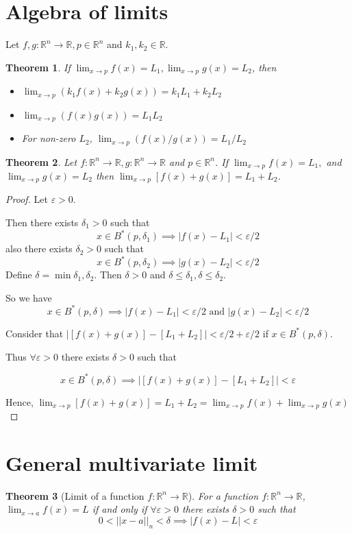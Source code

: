\documentclass[oneside,11pt,pdftex]{book}%
\numberwithin{equation}{section}
\newtheorem{theorem}{Theorem}[chapter]%
\numberwithin{section}{chapter}
\numberwithin{equation}{chapter}
\newcommand{\R}{\mathbb{R}}
\begin{document}
\section{Algebra of limits}
Let $ f,g: \R^n \rightarrow \R, p \in \R^n $ and $ k_1,k_2 \in \R $.
\begin{theorem}
	If $ \lim_{x \rightarrow p} f(x)=L_1, \lim_{x\rightarrow p}g(x)=L_2 $, then
	\begin{itemize}
		\item $\displaystyle \lim_{x \rightarrow p} (k_1 f(x)+k_2 g(x))=k_1 L_1+k_2 L_2 $
		\item $\displaystyle \lim_{x \rightarrow p} (f(x)g(x))=L_1 L_2 $
		\item For non-zero $ L_2 $, $\displaystyle \lim_{x \rightarrow p} (f(x)/g(x))=L_1/L_2 $
	\end{itemize}
\end{theorem}
\begin{theorem}
	Let $ f:\R^n \to \R, g:\R^n \to \R $ and $ p \in \R^n$. If $ \lim_{x\rightarrow p} f(x)=L_1, $ and $ \lim_{x \rightarrow p} g(x) =L_2$ then $ \lim_{x\rightarrow p} [f(x)+g(x)]=L_1+L_2 $.
\end{theorem}
\begin{proof}
	Let $ \varepsilon>0 $. 
	
	Then there exists $ \delta_1>0 $ such that\[ x \in B^*(p, \delta_1) \implies |f(x)-L_1|<\varepsilon/2 \]
	also there exists $ \delta_2>0 $ such that
	\[ x \in B^*(p,\delta_2) \implies |g(x)-L_2|<\varepsilon/2 \]
	Define $ \delta=\min{\delta_1,\delta_2 } $. Then $ \delta>0 $ and $ \delta\leq\delta_1,\delta\leq\delta_2  $.
	
	So we have $$ x\in B^*(p,\delta) \implies |f(x)-L_1|<\varepsilon/2 \text{ and } |g(x)-L_2|<\varepsilon/2 $$
	
	Consider that $ |[f(x) +g(x)]-[L_1+L_2]|<\varepsilon/2+\varepsilon/2$ if $ x\in B^*(p,\delta) $.
	
	Thus $ \forall \varepsilon>0 $ there exists $ \delta>0 $ such that
	
	\[ x\in B^*(p,\delta)\implies |[f(x) +g(x)]-[L_1+L_2]|<\varepsilon \]
	
	Hence, $ \lim_{x\rightarrow p} [f(x)+g(x)]=L_1+L_2=\lim_{x\rightarrow p}f(x)+\lim_{x \rightarrow p} g(x) $
\end{proof}

\section{General multivariate limit}
\begin{theorem}[Limit of a function $ f: \R^n \rightarrow \R $]
	For a function $ f:\R^n \rightarrow \R  $, $ \lim_{x\rightarrow a}f(x)=L $ if and only if $ \forall \varepsilon >0 $ there exists $ \delta>0 $ such that
	\[ 0<||x-a||_n<\delta \implies |f(x)-L|<\varepsilon \]
\end{theorem}
\end{document}
